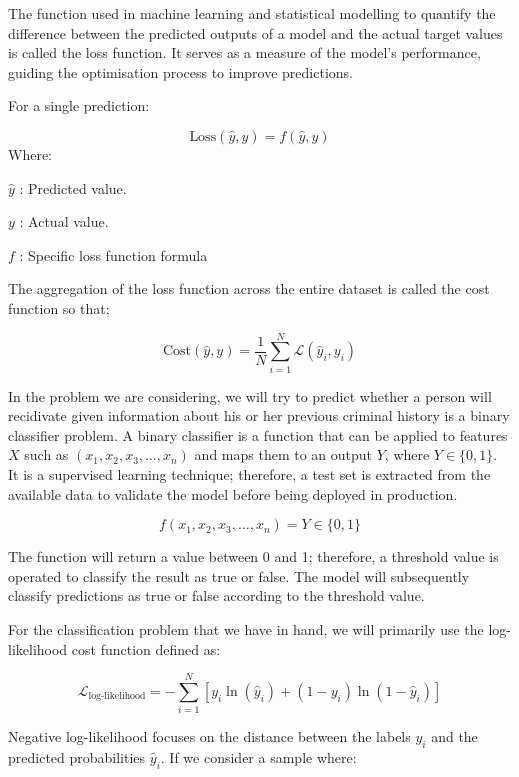 		The function used in machine learning and statistical modelling to quantify the difference between the predicted outputs of a model and the actual target values is called the loss function. It serves as a measure of the model's performance, guiding the optimisation process to improve predictions.
		
		For a single prediction:
		
		$$\text{Loss}(\hat{y}, y) = f(\hat{y}, y)$$
		Where:
		
		
		\begin{compactitem}
			\item [$\hat{y}$]: Predicted value.
			\item [$y$]: Actual value.
			\item [$f$]: Specific loss function formula
		\end{compactitem}
		
		\bigskip
		
		The aggregation of the loss function across the entire dataset is called the cost function so that;
		
		$$
		\text{Cost}(\hat{y}, y) = \frac{1}{N}\sum_{i=1}^{N} \mathcal{L}(\widehat{y}_i, y_i)
		$$
		
		In the problem we are considering, we will try to predict whether a person will recidivate given information about his or her previous criminal history is a binary classifier problem. A binary classifier is a function that can be applied to features $X$ such as $(x_1, x_2, x_3, \dots, x_n)$ and maps them to an output $Y$, where $Y \in \{0, 1\}$. It is a supervised learning technique; therefore, a test set is extracted from the available data to validate the model before being deployed in production.
		
		$$ f(x_1, x_2, x_3, \dots, x_n) = Y \in \{0, 1\}  $$
		
		The function will return a value between 0 and 1; therefore, a threshold value is operated to classify the result as true or false. The model will subsequently classify predictions as true or false according to the threshold value.
		
		
		For the classification problem that we have in hand, we will  primarily use the log-likelihood  cost function defined as:
		
		$$\mathcal{L}_{\text{log-likelihood}} = - \sum_{i=1}^N \left[ y_i \ln(\hat{y}_i) + (1 - y_i) \ln(1 - \hat{y}_i) \right]$$
		
		Negative log-likelihood focuses on the distance between the labels $y_i$ and the predicted probabilities $\hat{y}_i$. If we consider a sample where:
		
